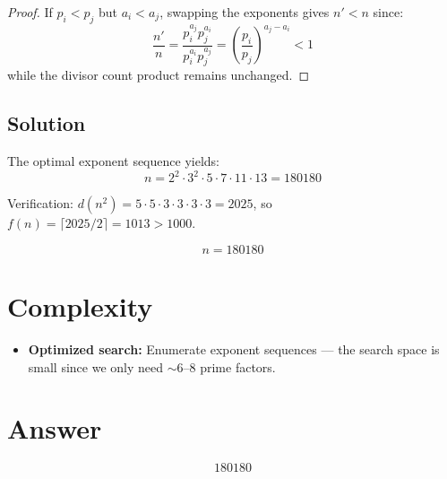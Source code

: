 \documentclass[12pt,a4paper]{article}
\theoremstyle{definition}
\begin{document}
\begin{proof}
If $p_i < p_j$ but $a_i < a_j$, swapping the exponents gives $n' < n$ since:
\[
\frac{n'}{n} = \frac{p_i^{a_j} p_j^{a_i}}{p_i^{a_i} p_j^{a_j}} = \left(\frac{p_i}{p_j}\right)^{a_j - a_i} < 1
\]
while the divisor count product remains unchanged.
\end{proof}

\subsection{Solution}

The optimal exponent sequence yields:
\[
n = 2^2 \cdot 3^2 \cdot 5 \cdot 7 \cdot 11 \cdot 13 = 180180
\]

Verification: $d(n^2) = 5 \cdot 5 \cdot 3 \cdot 3 \cdot 3 \cdot 3 = 2025$, so $f(n) = \lceil 2025/2 \rceil = 1013 > 1000$.

\[
\boxed{n = 180180}
\]

\section{Complexity}
\begin{itemize}
    \item \textbf{Optimized search:} Enumerate exponent sequences --- the search space is small since we only need $\sim 6$--8 prime factors.
\end{itemize}

\section{Answer}

\[
\boxed{180180}
\]
\end{document}

